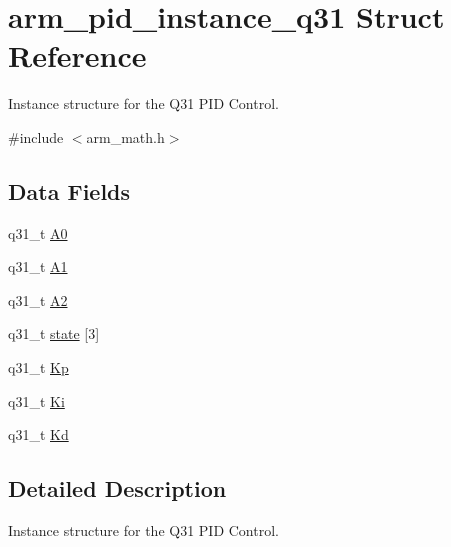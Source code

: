 \hypertarget{structarm__pid__instance__q31}{\section{arm\-\_\-pid\-\_\-instance\-\_\-q31 Struct Reference}
\label{structarm__pid__instance__q31}
}


Instance structure for the Q31 P\-I\-D Control.  




{\ttfamily \#include $<$arm\-\_\-math.\-h$>$}

\subsection*{Data Fields}
\begin{DoxyCompactItemize}
\item 
q31\-\_\-t \hyperlink{structarm__pid__instance__q31_ab58496a4137da4c667915a5fc0ef57ef}{A0}
\item 
q31\-\_\-t \hyperlink{structarm__pid__instance__q31_aeb897c84724b56948e4222aca8d0e1f4}{A1}
\item 
q31\-\_\-t \hyperlink{structarm__pid__instance__q31_a4ae945f839719fb2c04c978724b78ebb}{A2}
\item 
q31\-\_\-t \hyperlink{structarm__pid__instance__q31_af0a2da4da9a94af652873ec7e7be4880}{state} \mbox{[}3\mbox{]}
\item 
q31\-\_\-t \hyperlink{structarm__pid__instance__q31_a6ec4b37fe2246a7e017dd07578fe5bbd}{Kp}
\item 
q31\-\_\-t \hyperlink{structarm__pid__instance__q31_a84a6c05c16369c905193da0d5fc9a7b0}{Ki}
\item 
q31\-\_\-t \hyperlink{structarm__pid__instance__q31_a213bbf14da7ea536998f611977173552}{Kd}
\end{DoxyCompactItemize}


\subsection{Detailed Description}
Instance structure for the Q31 P\-I\-D Control. 

